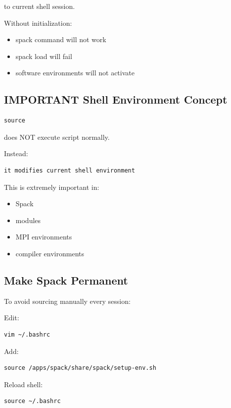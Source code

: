\documentclass[11pt]{article}
\begin{document}
to current shell session.

Without initialization:

\begin{itemize}
\item spack command will not work
\item spack load will fail
\item software environments will not activate
\end{itemize}
\subsection{IMPORTANT Shell Environment Concept}
\label{sec:org27b3d66}

\begin{verbatim}
source
\end{verbatim}

does NOT execute script normally.

Instead:

\begin{verbatim}
it modifies current shell environment
\end{verbatim}

This is extremely important in:

\begin{itemize}
\item Spack
\item modules
\item MPI environments
\item compiler environments
\end{itemize}
\subsection{Make Spack Permanent}
\label{sec:org3f0558f}

To avoid sourcing manually every session:

Edit:

\begin{verbatim}
vim ~/.bashrc
\end{verbatim}

Add:

\begin{verbatim}
source /apps/spack/share/spack/setup-env.sh
\end{verbatim}

Reload shell:

\begin{verbatim}
source ~/.bashrc
\end{verbatim}
\end{document}
